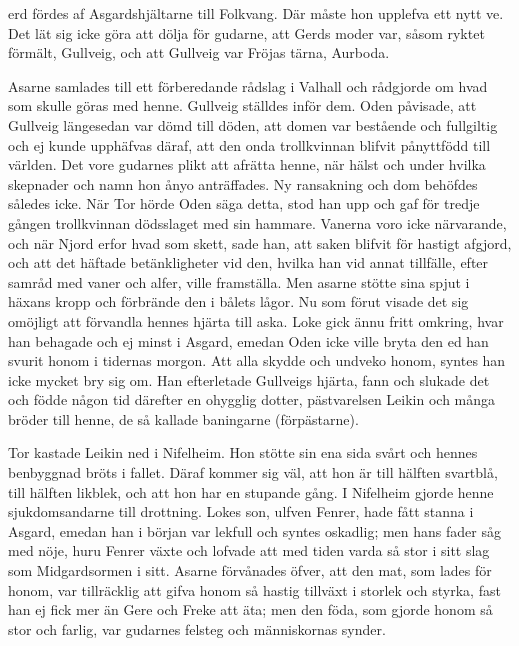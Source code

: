 \endSecII


\dropcapG erd fördes af Asgardshjältarne till Folkvang. Där måste hon upplefva
ett nytt ve. Det lät sig icke göra att dölja för gudarne, att Gerds
moder var, såsom ryktet förmält, Gullveig, och att Gullveig var Fröjas
tärna, Aurboda.

Asarne samlades till ett förberedande rådslag i Valhall och rådgjorde om
hvad som skulle göras med henne. Gullveig ställdes inför dem. Oden
påvisade, att Gullveig längesedan var dömd till döden, att domen var
bestående och fullgiltig och ej kunde upphäfvas däraf, att den onda
trollkvinnan blifvit pånyttfödd till världen. Det vore gudarnes plikt
att afrätta henne, när hälst och under hvilka skepnader och namn hon
ånyo anträffades. Ny ransakning och dom behöfdes således icke. När Tor
hörde Oden säga detta, stod han upp och gaf för tredje gången
trollkvinnan dödsslaget med sin hammare. Vanerna voro icke närvarande,
och när Njord erfor hvad som skett, sade han, att saken blifvit för
hastigt afgjord, och att det häftade betänkligheter vid den, hvilka han
vid annat tillfälle, efter samråd med vaner och alfer, ville framställa.
Men asarne stötte sina spjut i häxans kropp och förbrände den i bålets
lågor. Nu som förut visade det sig omöjligt att förvandla hennes hjärta
till aska. Loke gick ännu fritt omkring, hvar han behagade och ej minst
i Asgard, emedan Oden icke ville bryta den ed han svurit honom i
tidernas morgon. Att alla skydde och undveko honom, syntes han icke
mycket bry sig om. Han efterletade Gullveigs hjärta, fann och slukade
det och födde någon tid därefter en ohygglig dotter, pästvarelsen Leikin
och många bröder till henne, de så kallade baningarne (förpästarne).

Tor kastade Leikin ned i Nifelheim. Hon stötte sin ena sida svårt och
hennes benbyggnad bröts i fallet. Däraf kommer sig väl, att hon är till
hälften svartblå, till hälften likblek, och att hon har en stupande
gång. I Nifelheim gjorde henne
sjukdomsandarne till drottning. Lokes son, ulfven Fenrer, hade fått
stanna i Asgard, emedan han i början var lekfull och syntes oskadlig;
men hans fader såg med nöje, huru Fenrer växte och lofvade att med tiden
varda så stor i sitt slag som Midgardsormen i sitt. Asarne förvånades
öfver, att den mat, som lades för honom, var tillräcklig att gifva honom
så hastig tillväxt i storlek och styrka, fast han ej fick mer än Gere
och Freke att äta; men den föda, som gjorde honom så stor och farlig,
var gudarnes felsteg och människornas synder.

